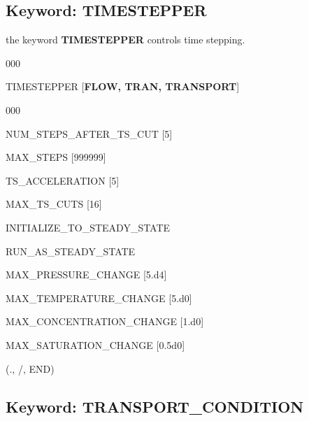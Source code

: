 \documentclass[12pt]{article}
\begin{document}
\newpage
\protect\hypertarget{target_timestep}{}

\subsection{Keyword: TIMESTEPPER}

 the keyword {\bf TIMESTEPPER} controls time stepping.

\begin{deflist}{000}
\item[TIMESTEPPER] [{\bf FLOW, TRAN, TRANSPORT}]
\begin{deflist}{000}
\item[NUM\_STEPS\_AFTER\_TS\_CUT] [5]
\item[MAX\_STEPS] [999999]
\item[TS\_ACCELERATION] [5]
\item[MAX\_TS\_CUTS] [16]
\item[INITIALIZE\_TO\_STEADY\_STATE]
\item[RUN\_AS\_STEADY\_STATE]
\item[MAX\_PRESSURE\_CHANGE] [5.d4]
\item[MAX\_TEMPERATURE\_CHANGE] [5.d0]
\item[MAX\_CONCENTRATION\_CHANGE] [1.d0]
\item[MAX\_SATURATION\_CHANGE] [0.5d0]
\end{deflist}
\item[(., /, END)]
\end{deflist}




\newpage
\protect\hypertarget{target_trans_cond}{}

\subsection{Keyword: TRANSPORT\_CONDITION}

\end{document}
